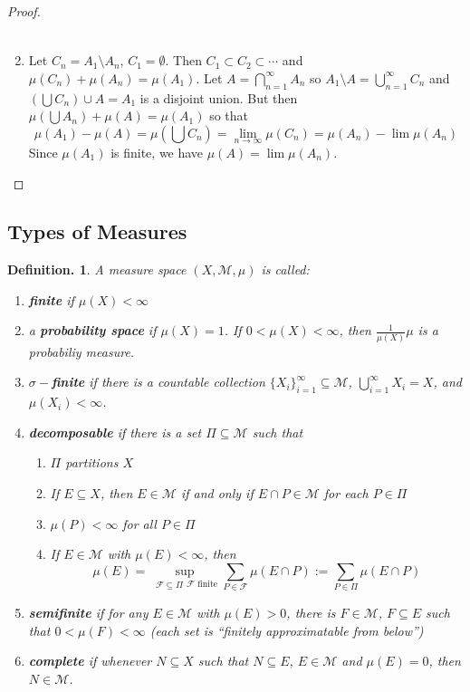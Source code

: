 \documentclass[12pt, a4paper]{memoir}
\theoremstyle{nonumberplain}
\newtheorem{definition}{Definition.}
\newtheorem{proof}{Proof}
\begin{document}
\begin{proof}
\begin{enumerate}
\begin{align*}
            \end{align*}
        \item Let $C_n=A_1\setminus A_n$, $C_1=\emptyset$.
            Then $C_1\subset C_2\subset\cdots$ and $\mu(C_n)+\mu(A_n)=\mu(A_1)$.
            Let $A=\bigcap\limits_{n=1}^\infty A_n$ so $A_1\setminus A=\bigcup\limits_{n=1}^\infty C_n$ and $(\bigcup C_n)\cup A=A_1$ is a disjoint union.
            But then $\mu(\bigcup A_n)+\mu(A)=\mu(A_1)$ so that
            \begin{equation*}\mu(A_1)-\mu(A)=\mu(\bigcup C_n)=\lim_{n\to\infty}\mu(C_n)=\mu(A_n)-\lim \mu(A_n)\end{equation*}
            Since $\mu(A_1)$ is finite, we have $\mu(A)=\lim\mu(A_n)$.
    \end{enumerate}
\end{proof}
\subsection{Types of Measures}
\begin{definition}
    A measure space $(X,\mathcal{M},\mu)$ is called:
    \begin{enumerate}[nolistsep]
        \item \textbf{finite} if $\mu(X)<\infty$
        \item a \textbf{probability space} if $\mu(X)=1$.
            If $0<\mu(X)<\infty$, then $\frac{1}{\mu(X)}\mu$ is a probabiliy measure.
        \item \textbf{$\sigma-$finite} if there is a countable collection $\{X_i\}_{i=1}^\infty\subseteq\mathcal{M}$, $\bigcup_{i=1}^\infty X_i=X$, and $\mu(X_i)<\infty$.
        \item \textbf{decomposable} if there is a set $\Pi\subseteq\mathcal{M}$ such that
            \begin{enumerate}[nolistsep]
                \item $\Pi$ partitions $X$
                \item If $E\subseteq X$, then $E\in\mathcal{M}$ if and only if $E\cap P\in\mathcal{M}$ for each $P\in\Pi$
                \item $\mu(P)<\infty$ for all $P\in\Pi$
                \item If $E\in\mathcal{M}$ with $\mu(E)<\infty$, then
                    \begin{equation*}
                        \mu(E)=\sup_{\substack{\mathcal{F}\subseteq\Pi}{\mathcal{F} \text{ finite}}}\sum\limits_{P\in\mathcal{F}}\mu(E\cap P):=\sum\limits_{P\in\Pi}\mu(E\cap P)
                    \end{equation*}
            \end{enumerate}
        \item \textbf{semifinite} if for any $E\in\mathcal{M}$ with $\mu(E)>0$, there is $F\in\mathcal{M}$, $F\subseteq E$ such that $0<\mu(F)<\infty$ (each set is ``finitely approximatable from below'')
        \item \textbf{complete} if whenever $N\subseteq X$ such that $N\subseteq E$, $E\in\mathcal{M}$ and $\mu(E)=0$, then $N\in\mathcal{M}$.
    \end{enumerate}
\end{definition}
\end{document}
